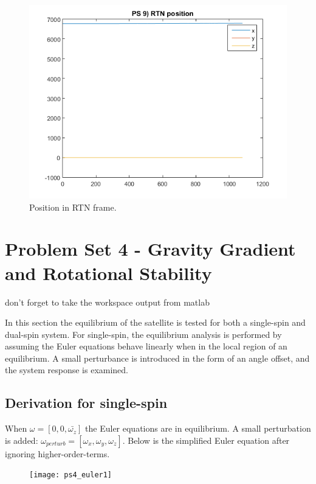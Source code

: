 \documentclass[12pt, letterpaper]{article}
\begin{document}
\begin{figure}[H]
	\centering
	\includegraphics[scale=0.9,trim={10mm, 5mm, 13mm, 3mm},clip]{ps9_03}
	\caption{Position in RTN frame.}
	\label{3:RTN}
\end{figure}



\section{Problem Set 4 - Gravity Gradient and Rotational Stability}

don't forget to take the workspace output from matlab

In this section the equilibrium of the satellite is tested for both a single-spin and dual-spin system. For single-spin, the equilibrium analysis is performed by assuming the Euler equations behave linearly when in the local region of an equilibrium. A small perturbance is introduced in the form of an angle offset, and the system response is examined.

\subsection{Derivation for single-spin}

When $\omega=[0,0,\bar{\omega_z}]$ the Euler equations are in equilibrium. A small perturbation is added: $\omega_{perturb}=[\omega_x, \omega_y, \omega_z]$. Below is the simplified Euler equation after ignoring higher-order-terms.

\begin{figure}[H]
	\centering
	\texttt{[image: ps4\_euler1]}
\end{figure}
\end{document}

